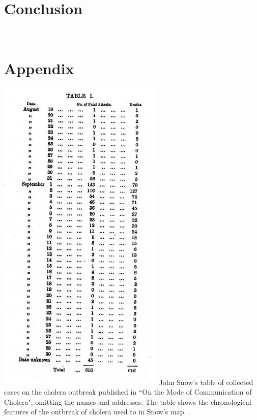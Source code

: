 \documentclass[12pt]{article}
\begin{document}
\section{Conclusion}


% 
% 

\newpage
\appendix
\section{\\Appendix} \label{App:AppendixA}
\centering
\includegraphics[scale=0.8]{table}
John Snow's table of collected cases on the cholera outbreak published in ``On the Mode of Communication of Cholera", omitting the names and addresses. The table shows the chronological features of the outbreak of cholera used to in Snow's map. \cite{original}.
\newpage



\end{document}

